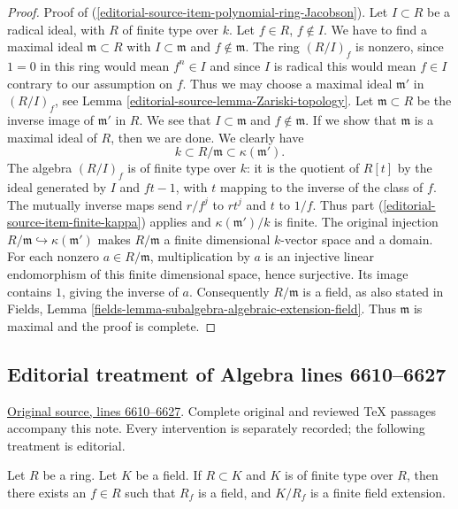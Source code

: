 \begin{proof}
\medskip\noindent
Proof of (\ref{editorial-source-item-polynomial-ring-Jacobson}). Let
$I \subset R$ be a radical ideal, with $R$ of finite type over $k$.
Let $f \in R$, $f \not \in I$. We have to find a maximal ideal
$\mathfrak m \subset R$ with $I \subset \mathfrak m$ and
$f \not \in \mathfrak m$. The ring $(R/I)_f$ is nonzero, since
$1 = 0$ in this ring would mean $f^n \in I$ and since $I$ is
radical this would mean $f \in I$ contrary to our assumption on $f$.
Thus we may choose a maximal ideal $\mathfrak m'$
in $(R/I)_f$, see Lemma \ref{editorial-source-lemma-Zariski-topology}.
Let $\mathfrak m \subset R$
be the inverse image of $\mathfrak m'$ in $R$. We see that
$I \subset \mathfrak m$
and $f \not \in \mathfrak m$. If we show that $\mathfrak m$ is a maximal
ideal of $R$, then we are done. We clearly have
$$
k \subset R/\mathfrak m \subset \kappa(\mathfrak m').
$$
The algebra $(R/I)_f$ is of finite type over $k$: it is the quotient
of $R[t]$ by the ideal generated by $I$ and $ft-1$, with $t$ mapping
to the inverse of the class of $f$. The mutually inverse maps send
$r/f^j$ to $rt^j$ and $t$ to $1/f$.
Thus part (\ref{editorial-source-item-finite-kappa}) applies and
$\kappa(\mathfrak m')/k$ is finite. The original injection
$R/\mathfrak m\hookrightarrow\kappa(\mathfrak m')$ makes
$R/\mathfrak m$ a finite dimensional $k$-vector space and a domain.
For each nonzero $a\in R/\mathfrak m$, multiplication by $a$ is
an injective linear endomorphism of this finite dimensional space,
hence surjective. Its image contains $1$, giving the inverse of $a$.
Consequently $R/\mathfrak m$ is a field, as also stated in Fields,
Lemma \ref{fields-lemma-subalgebra-algebraic-extension-field}.
Thus $\mathfrak m$ is maximal and the proof is complete.
\end{proof}


\subsection{Editorial treatment of Algebra lines 6610--6627}

\hypertarget{algebra-context-055}{}

\noindent\href{https://github.com/stacks/stacks-project/blob/a04446e57ec1fbc252a871afcec7752fb2807b14/algebra.tex\#L6610}{Original source, lines 6610--6627}. Complete original and reviewed TeX passages accompany this note. Every intervention is separately recorded; the following treatment is editorial.


\begin{lemma}
\label{editorial-source-lemma-field-finite-type-over-domain}
Let $R$ be a ring. Let $K$ be a field.
If $R \subset K$ and $K$ is of finite type over $R$,
then there exists an $f \in R$ such that $R_f$ is a field,
and $K/R_f$ is a finite field extension.
\end{lemma}

